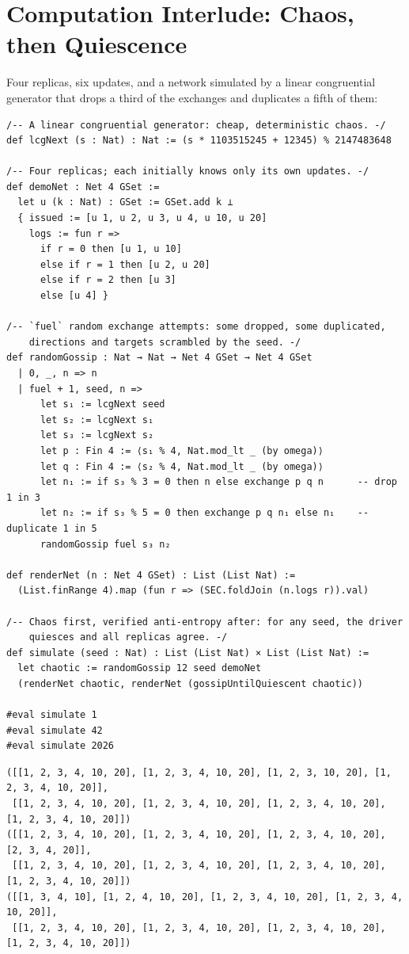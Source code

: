 \documentclass[12pt, a4paper, openright]{book}
\theoremstyle{thmstyle}
\theoremstyle{defstyle}
\begin{document}
\section{Computation Interlude: Chaos, then Quiescence}

Four replicas, six updates, and a network simulated by a linear
congruential generator that drops a third of the exchanges and
duplicates a fifth of them:

\begin{verbatim}
/-- A linear congruential generator: cheap, deterministic chaos. -/
def lcgNext (s : Nat) : Nat := (s * 1103515245 + 12345) % 2147483648

/-- Four replicas; each initially knows only its own updates. -/
def demoNet : Net 4 GSet :=
  let u (k : Nat) : GSet := GSet.add k ⊥
  { issued := [u 1, u 2, u 3, u 4, u 10, u 20]
    logs := fun r =>
      if r = 0 then [u 1, u 10]
      else if r = 1 then [u 2, u 20]
      else if r = 2 then [u 3]
      else [u 4] }

/-- `fuel` random exchange attempts: some dropped, some duplicated,
    directions and targets scrambled by the seed. -/
def randomGossip : Nat → Nat → Net 4 GSet → Net 4 GSet
  | 0, _, n => n
  | fuel + 1, seed, n =>
      let s₁ := lcgNext seed
      let s₂ := lcgNext s₁
      let s₃ := lcgNext s₂
      let p : Fin 4 := ⟨s₁ % 4, Nat.mod_lt _ (by omega)⟩
      let q : Fin 4 := ⟨s₂ % 4, Nat.mod_lt _ (by omega)⟩
      let n₁ := if s₃ % 3 = 0 then n else exchange p q n      -- drop 1 in 3
      let n₂ := if s₃ % 5 = 0 then exchange p q n₁ else n₁    -- duplicate 1 in 5
      randomGossip fuel s₃ n₂

def renderNet (n : Net 4 GSet) : List (List Nat) :=
  (List.finRange 4).map (fun r => (SEC.foldJoin (n.logs r)).val)

/-- Chaos first, verified anti-entropy after: for any seed, the driver
    quiesces and all replicas agree. -/
def simulate (seed : Nat) : List (List Nat) × List (List Nat) :=
  let chaotic := randomGossip 12 seed demoNet
  (renderNet chaotic, renderNet (gossipUntilQuiescent chaotic))

#eval simulate 1
#eval simulate 42
#eval simulate 2026
\end{verbatim}

\begin{verbatim}
([[1, 2, 3, 4, 10, 20], [1, 2, 3, 4, 10, 20], [1, 2, 3, 10, 20], [1, 2, 3, 4, 10, 20]],
 [[1, 2, 3, 4, 10, 20], [1, 2, 3, 4, 10, 20], [1, 2, 3, 4, 10, 20], [1, 2, 3, 4, 10, 20]])
([[1, 2, 3, 4, 10, 20], [1, 2, 3, 4, 10, 20], [1, 2, 3, 4, 10, 20], [2, 3, 4, 20]],
 [[1, 2, 3, 4, 10, 20], [1, 2, 3, 4, 10, 20], [1, 2, 3, 4, 10, 20], [1, 2, 3, 4, 10, 20]])
([[1, 3, 4, 10], [1, 2, 4, 10, 20], [1, 2, 3, 4, 10, 20], [1, 2, 3, 4, 10, 20]],
 [[1, 2, 3, 4, 10, 20], [1, 2, 3, 4, 10, 20], [1, 2, 3, 4, 10, 20], [1, 2, 3, 4, 10, 20]])
\end{verbatim}
\end{document}
